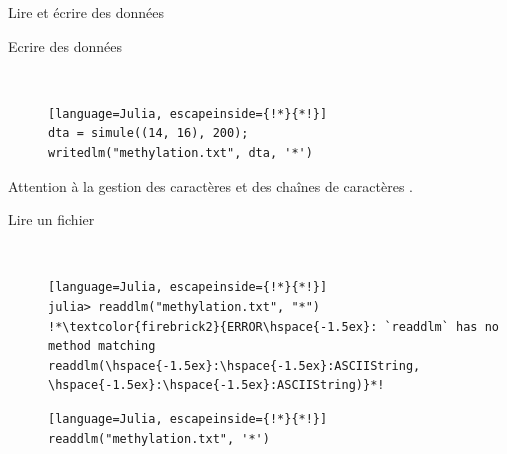 \begin{frame}[containsverbatim]{Lire et écrire des données}
\begin{description}
\item[Ecrire des données] \ \\
\begin{lstlisting}[language=Julia, escapeinside={!*}{*!}]
dta = simule((14, 16), 200);
writedlm("methylation.txt", dta, '*')
\end{lstlisting}
\end{description}
\par{\textcolor{firebrick2}{Attention à la gestion des caractères} \cmdb{\textquotesingle} \textcolor{firebrick2}{et des chaînes de caractères} \textcolor{firebrick2}{.}}
\vspace{2ex}
\begin{description}
\item[Lire un fichier] \ \\
\begin{lstlisting}[language=Julia, escapeinside={!*}{*!}]
julia> readdlm("methylation.txt", "*")
!*\textcolor{firebrick2}{ERROR\hspace{-1.5ex}: `readdlm` has no method matching readdlm(\hspace{-1.5ex}:\hspace{-1.5ex}:ASCIIString, \hspace{-1.5ex}:\hspace{-1.5ex}:ASCIIString)}*!
\end{lstlisting}
\vspace{-3ex}
\begin{lstlisting}[language=Julia, escapeinside={!*}{*!}]
readdlm("methylation.txt", '*')
\end{lstlisting}
\end{description}
\end{frame}


